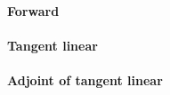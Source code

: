 \paragraph{Forward}
\label{sec:dom-radiance_at_optical_depth-forward}


%
\paragraph{Tangent linear}
\label{sec:dom-radiance_at_optical_depth-tangent_linear}


%
\paragraph{Adjoint of tangent linear}
\label{sec:dom-radiance_at_optical_depth-adjoint_of_tangent_linear}
